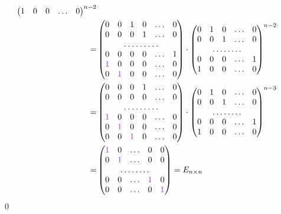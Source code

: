 \documentclass[a4paper,12pt]{article}
\theoremstyle{definition}
\theoremstyle{remark}
\theoremstyle{remark}
\begin{document}
\begin{equation*}
\begin{split}
\begin{pmatrix}
        1 & 0 & 0 & \ldots & 0
      \end{pmatrix}^{n-2}\\
    = &\begin{pmatrix}
        0 & 0 & 1 & 0 & \ldots & 0\\
        0 & 0 & 0 & 1 & \ldots & 0\\
        \hdotsfor{6}\\
        0 & 0 & 0 & 0 & \ldots & 1\\
        \textcolor{purpleL}{1} & 0 & 0 & 0 & \ldots & 0\\
        0 & \textcolor{purpleL}{1} & 0 & 0 & \ldots & 0
      \end{pmatrix}
      \cdot \begin{pmatrix}
        0 & 1 & 0 & \ldots & 0\\
        0 & 0 & 1 & \ldots & 0\\
        \hdotsfor{5}\\
        0 & 0 & 0 & \ldots & 1\\
        1 & 0 & 0 & \ldots & 0
      \end{pmatrix}^{n-2}\\
    = &\begin{pmatrix}
        0 & 0 & 0 & 1 & \ldots & 0\\
        0 & 0 & 0 & 0 & \ldots & 0\\
        \hdotsfor{6}\\
        \textcolor{purpleL}{1} & 0 & 0 & 0 & \ldots & 0\\
        0 & \textcolor{purpleL}{1} & 0 & 0 & \ldots & 0\\
        0 & 0 & \textcolor{purpleL}{1} & 0 & \ldots & 0
      \end{pmatrix}
      \cdot \begin{pmatrix}
        0 & 1 & 0 & \ldots & 0\\
        0 & 0 & 1 & \ldots & 0\\
        \hdotsfor{5}\\
        0 & 0 & 0 & \ldots & 1\\
        1 & 0 & 0 & \ldots & 0
      \end{pmatrix}^{n-3}\\
    = &\begin{pmatrix}
        \textcolor{purpleL}{1} & 0 & \ldots & 0 & 0\\
        0 & \textcolor{purpleL}{1} & \ldots & 0 & 0\\
        \hdotsfor{5}\\
        0 & 0 & \ldots & \textcolor{purpleL}{1} & 0\\
        0 & 0 & \ldots & 0 & \textcolor{purpleL}{1}
      \end{pmatrix}
    = E_{n \times n}
  \end{split}
  \end{equation*}
  \qed
  
\end{document}
